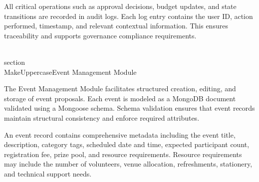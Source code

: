 All critical operations such as approval decisions, budget updates, and state transitions are recorded in audit logs. Each log entry contains the user ID, action performed, timestamp, and relevant contextual information. This ensures traceability and supports governance compliance requirements.

\\section{\\MakeUppercase{Event Management Module}}

The Event Management Module facilitates structured creation, editing, and storage of event proposals. Each event is modeled as a MongoDB document validated using a Mongoose schema. Schema validation ensures that event records maintain structural consistency and enforce required attributes.

An event record contains comprehensive metadata including the event title, description, category tags, scheduled date and time, expected participant count, registration fee, prize pool, and resource requirements. Resource requirements may include the number of volunteers, venue allocation, refreshments, stationery, and technical support needs.

